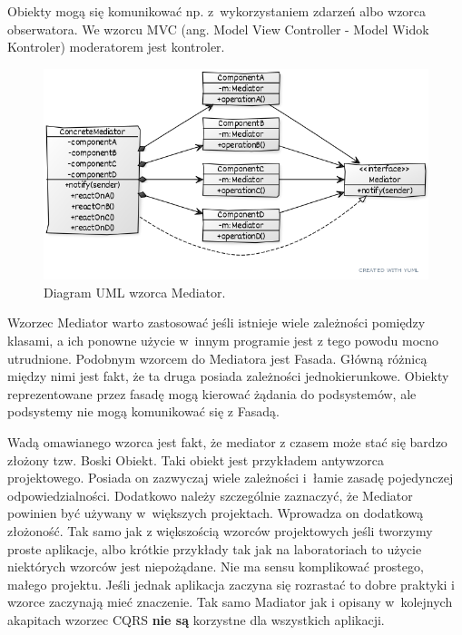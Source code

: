Obiekty mogą się komunikować np. z~wykorzystaniem zdarzeń albo wzorca obserwatora. We wzorcu MVC (ang. Model View Controller - Model Widok Kontroler) moderatorem jest kontroler.

\begin{figure}[hbt!]
	\centering
	\includegraphics[width=0.9\linewidth]{images/MediatorUml}
	\caption{Diagram UML wzorca Mediator.}
	\label{lab4/fig/MediatorUml}
\end{figure}
%

Wzorzec Mediator warto zastosować jeśli istnieje wiele zależności pomiędzy klasami, a ich ponowne użycie w~innym programie jest z tego powodu mocno utrudnione. Podobnym wzorcem do Mediatora jest Fasada. Główną różnicą między nimi jest fakt, że ta druga posiada zależności jednokierunkowe. Obiekty reprezentowane przez fasadę mogą kierować żądania do podsystemów, ale podsystemy nie mogą komunikować się z Fasadą.

Wadą omawianego wzorca jest fakt, że mediator z czasem może stać się bardzo złożony tzw. Boski Obiekt. Taki obiekt jest przykładem antywzorca projektowego. Posiada on zazwyczaj wiele zależności i~łamie zasadę pojedynczej odpowiedzialności. Dodatkowo należy szczególnie zaznaczyć, że Mediator powinien być używany w~większych projektach. Wprowadza on dodatkową złożoność. Tak samo jak z większością wzorców projektowych jeśli tworzymy proste aplikacje, albo krótkie przykłady tak jak na laboratoriach to użycie niektórych wzorców jest niepożądane. Nie ma sensu komplikować prostego, małego projektu.
Jeśli jednak aplikacja zaczyna się rozrastać to dobre praktyki i wzorce zaczynają mieć znaczenie. %
Tak samo Madiator jak i opisany w~kolejnych akapitach wzorzec CQRS \textbf{nie są} korzystne dla wszystkich aplikacji.

